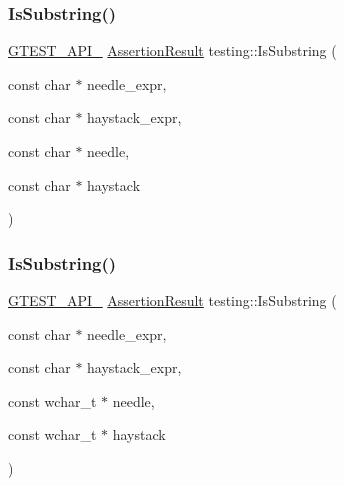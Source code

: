 \subsubsection{\texorpdfstring{IsSubstring()}{IsSubstring()}\hspace{0.1cm}{\footnotesize\ttfamily [1/3]}}
{\footnotesize\ttfamily \mbox{\hyperlink{gtest-port_8h_aa73be6f0ba4a7456180a94904ce17790}{G\+T\+E\+S\+T\+\_\+\+A\+P\+I\+\_\+}} \mbox{\hyperlink{classtesting_1_1_assertion_result}{Assertion\+Result}} testing\+::\+Is\+Substring (\begin{DoxyParamCaption}\item[{const char $\ast$}]{needle\+\_\+expr,  }\item[{const char $\ast$}]{haystack\+\_\+expr,  }\item[{const char $\ast$}]{needle,  }\item[{const char $\ast$}]{haystack }\end{DoxyParamCaption})}

\mbox{\label{namespacetesting_a08ce65847491b27a38cbac3ac15e3035}} 
\subsubsection{\texorpdfstring{IsSubstring()}{IsSubstring()}\hspace{0.1cm}{\footnotesize\ttfamily [2/3]}}
{\footnotesize\ttfamily \mbox{\hyperlink{gtest-port_8h_aa73be6f0ba4a7456180a94904ce17790}{G\+T\+E\+S\+T\+\_\+\+A\+P\+I\+\_\+}} \mbox{\hyperlink{classtesting_1_1_assertion_result}{Assertion\+Result}} testing\+::\+Is\+Substring (\begin{DoxyParamCaption}\item[{const char $\ast$}]{needle\+\_\+expr,  }\item[{const char $\ast$}]{haystack\+\_\+expr,  }\item[{const wchar\+\_\+t $\ast$}]{needle,  }\item[{const wchar\+\_\+t $\ast$}]{haystack }\end{DoxyParamCaption})}

\mbox{\label{namespacetesting_a32718fab95b2833ab5ffc9cfc9f5c8b0}} 

